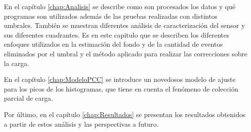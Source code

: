 En el capítulo \ref{chap:Analisis} se describe como son procesados los datos y qué programas son utilizados además de las pruebas realizadas con distintos umbrales. También se muestran diferentes análisis de caracterización del sensor y sus diferentes cuadrantes. Es en este capitulo que se describen los diferentes enfoques utilizados en la estimación del fondo y de la cantidad de eventos eliminados por el umbral y el método aplicado para realizar las correcciones sobre la carga.

En el capítulo \ref{chap:ModeloPCC} se introduce un novedosos modelo de ajuste para los picos de los histogramas, que tiene en cuenta el fenómeno de colección parcial de carga.

Por último, en el capítulo \ref{chap:Resultados} se presentan los resultados obtenidos a partir de estos análisis y las perspectivas a futuro.



